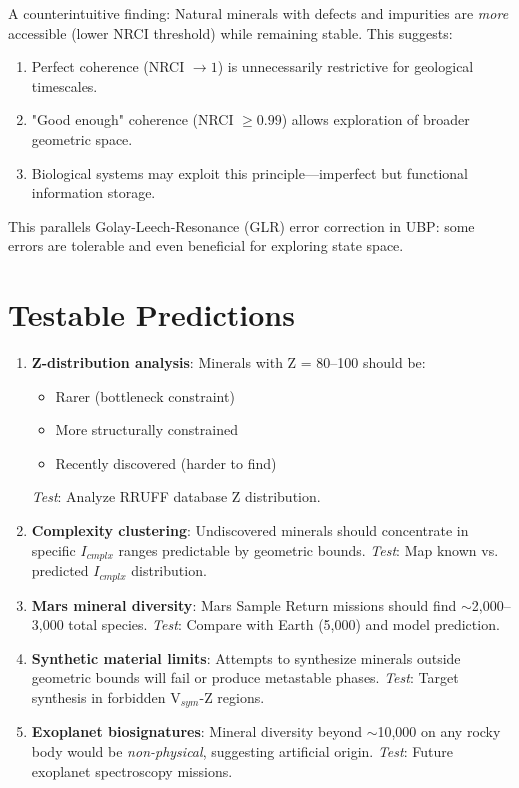 \documentclass[11pt,a4paper]{article}
\begin{document}
A counterintuitive finding: Natural minerals with defects and impurities are \textit{more} accessible (lower NRCI threshold) while remaining stable. This suggests:

\begin{enumerate}
\item Perfect coherence (NRCI $\rightarrow 1$) is unnecessarily restrictive for geological timescales.
\item "Good enough" coherence (NRCI $\geq 0.99$) allows exploration of broader geometric space.
\item Biological systems may exploit this principle—imperfect but functional information storage.
\end{enumerate}

This parallels Golay-Leech-Resonance (GLR) error correction in UBP: some errors are tolerable and even beneficial for exploring state space.

\section{Testable Predictions}

\begin{enumerate}
\item \textbf{Z-distribution analysis}: Minerals with Z = 80--100 should be:
   \begin{itemize}
   \item Rarer (bottleneck constraint)
   \item More structurally constrained
   \item Recently discovered (harder to find)
   \end{itemize}
   \textit{Test}: Analyze RRUFF database Z distribution.

\item \textbf{Complexity clustering}: Undiscovered minerals should concentrate in specific $I_{cmplx}$ ranges predictable by geometric bounds.
   \textit{Test}: Map known vs. predicted $I_{cmplx}$ distribution.

\item \textbf{Mars mineral diversity}: Mars Sample Return missions should find $\sim$2,000--3,000 total species.
   \textit{Test}: Compare with Earth (5,000) and model prediction.

\item \textbf{Synthetic material limits}: Attempts to synthesize minerals outside geometric bounds will fail or produce metastable phases.
   \textit{Test}: Target synthesis in forbidden V$_{sym}$-Z regions.

\item \textbf{Exoplanet biosignatures}: Mineral diversity beyond $\sim$10,000 on any rocky body would be \textit{non-physical}, suggesting artificial origin.
   \textit{Test}: Future exoplanet spectroscopy missions.
\end{enumerate}
\end{document}
